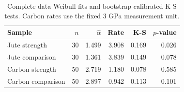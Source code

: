 \begin{table}[htbp]
\centering
\caption{Complete-data Weibull fits and bootstrap-calibrated K-S tests. Carbon rates use the fixed 3 GPa measurement unit.}\label{tab:gof}
\small
\begin{tabular}{lrrrrr}
\toprule
Sample & $n$ & $\widehat\alpha$ & Rate & K-S & $p$-value \\
\midrule
Jute strength & 30 & 1.499 & 3.908 & 0.169 & 0.026 \\
Jute comparison & 30 & 1.361 & 3.839 & 0.149 & 0.078 \\
Carbon strength & 50 & 2.719 & 1.180 & 0.078 & 0.585 \\
Carbon comparison & 50 & 2.897 & 0.942 & 0.113 & 0.101 \\
\bottomrule
\end{tabular}
\end{table}
